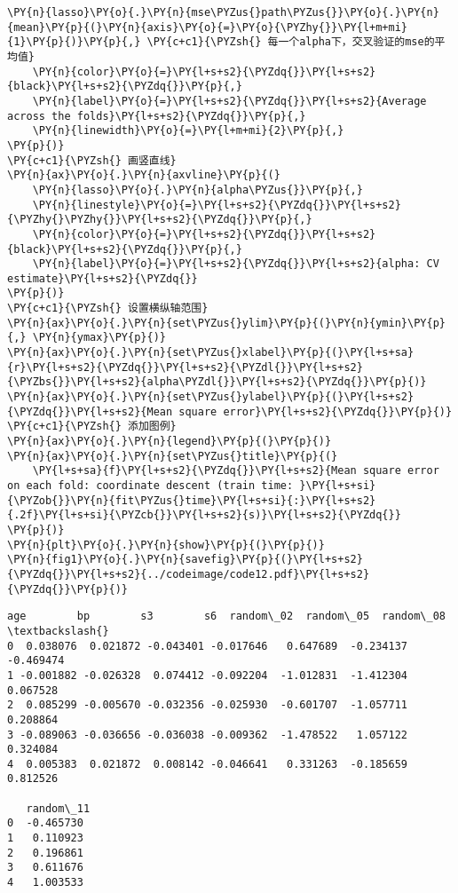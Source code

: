 \begin{Verbatim}[commandchars=\\\{\}]
    \PY{n}{lasso}\PY{o}{.}\PY{n}{mse\PYZus{}path\PYZus{}}\PY{o}{.}\PY{n}{mean}\PY{p}{(}\PY{n}{axis}\PY{o}{=}\PY{o}{\PYZhy{}}\PY{l+m+mi}{1}\PY{p}{)}\PY{p}{,} \PY{c+c1}{\PYZsh{} 每一个alpha下，交叉验证的mse的平均值}
    \PY{n}{color}\PY{o}{=}\PY{l+s+s2}{\PYZdq{}}\PY{l+s+s2}{black}\PY{l+s+s2}{\PYZdq{}}\PY{p}{,}
    \PY{n}{label}\PY{o}{=}\PY{l+s+s2}{\PYZdq{}}\PY{l+s+s2}{Average across the folds}\PY{l+s+s2}{\PYZdq{}}\PY{p}{,}
    \PY{n}{linewidth}\PY{o}{=}\PY{l+m+mi}{2}\PY{p}{,}
\PY{p}{)}
\PY{c+c1}{\PYZsh{} 画竖直线}
\PY{n}{ax}\PY{o}{.}\PY{n}{axvline}\PY{p}{(}
    \PY{n}{lasso}\PY{o}{.}\PY{n}{alpha\PYZus{}}\PY{p}{,} 
    \PY{n}{linestyle}\PY{o}{=}\PY{l+s+s2}{\PYZdq{}}\PY{l+s+s2}{\PYZhy{}\PYZhy{}}\PY{l+s+s2}{\PYZdq{}}\PY{p}{,} 
    \PY{n}{color}\PY{o}{=}\PY{l+s+s2}{\PYZdq{}}\PY{l+s+s2}{black}\PY{l+s+s2}{\PYZdq{}}\PY{p}{,} 
    \PY{n}{label}\PY{o}{=}\PY{l+s+s2}{\PYZdq{}}\PY{l+s+s2}{alpha: CV estimate}\PY{l+s+s2}{\PYZdq{}}
\PY{p}{)}
\PY{c+c1}{\PYZsh{} 设置横纵轴范围}
\PY{n}{ax}\PY{o}{.}\PY{n}{set\PYZus{}ylim}\PY{p}{(}\PY{n}{ymin}\PY{p}{,} \PY{n}{ymax}\PY{p}{)}
\PY{n}{ax}\PY{o}{.}\PY{n}{set\PYZus{}xlabel}\PY{p}{(}\PY{l+s+sa}{r}\PY{l+s+s2}{\PYZdq{}}\PY{l+s+s2}{\PYZdl{}}\PY{l+s+s2}{\PYZbs{}}\PY{l+s+s2}{alpha\PYZdl{}}\PY{l+s+s2}{\PYZdq{}}\PY{p}{)}
\PY{n}{ax}\PY{o}{.}\PY{n}{set\PYZus{}ylabel}\PY{p}{(}\PY{l+s+s2}{\PYZdq{}}\PY{l+s+s2}{Mean square error}\PY{l+s+s2}{\PYZdq{}}\PY{p}{)}
\PY{c+c1}{\PYZsh{} 添加图例}
\PY{n}{ax}\PY{o}{.}\PY{n}{legend}\PY{p}{(}\PY{p}{)}
\PY{n}{ax}\PY{o}{.}\PY{n}{set\PYZus{}title}\PY{p}{(}
    \PY{l+s+sa}{f}\PY{l+s+s2}{\PYZdq{}}\PY{l+s+s2}{Mean square error on each fold: coordinate descent (train time: }\PY{l+s+si}{\PYZob{}}\PY{n}{fit\PYZus{}time}\PY{l+s+si}{:}\PY{l+s+s2}{.2f}\PY{l+s+si}{\PYZcb{}}\PY{l+s+s2}{s)}\PY{l+s+s2}{\PYZdq{}}
\PY{p}{)}
\PY{n}{plt}\PY{o}{.}\PY{n}{show}\PY{p}{(}\PY{p}{)}
\PY{n}{fig1}\PY{o}{.}\PY{n}{savefig}\PY{p}{(}\PY{l+s+s2}{\PYZdq{}}\PY{l+s+s2}{../codeimage/code12.pdf}\PY{l+s+s2}{\PYZdq{}}\PY{p}{)}
\end{Verbatim}

\begin{Verbatim}[commandchars=\\\{\}]
        age        bp        s3        s6  random\_02  random\_05  random\_08  \textbackslash{}
0  0.038076  0.021872 -0.043401 -0.017646   0.647689  -0.234137  -0.469474
1 -0.001882 -0.026328  0.074412 -0.092204  -1.012831  -1.412304   0.067528
2  0.085299 -0.005670 -0.032356 -0.025930  -0.601707  -1.057711   0.208864
3 -0.089063 -0.036656 -0.036038 -0.009362  -1.478522   1.057122   0.324084
4  0.005383  0.021872  0.008142 -0.046641   0.331263  -0.185659   0.812526

   random\_11
0  -0.465730
1   0.110923
2   0.196861
3   0.611676
4   1.003533
\end{Verbatim}

